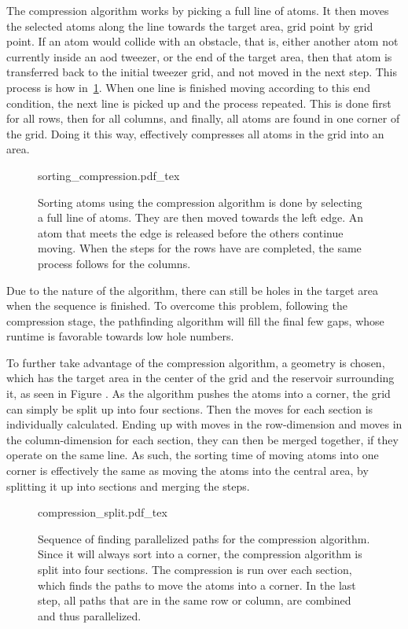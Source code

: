 The compression algorithm works by picking a full line of atoms. It then moves the selected atoms along the line towards the target area, grid point by grid point. If an atom would collide with an obstacle, that is, either another atom not currently inside an \ac{aod} tweezer, or the end of the target area, then that atom is transferred back to the initial tweezer grid, and not moved in the next step. This process is how in~\ref{fig:sorting_compression}. When one line is finished moving according to this end condition, the next line is picked up and the process repeated. This is done first for all rows, then for all columns, and finally, all atoms are found in one corner of the grid. Doing it this way, effectively compresses all atoms in the grid into an area.

\begin{figure}[ht]%
\label{fig:sorting_compression}
\centering
	{sorting_compression.pdf_tex}
	\caption{Sorting atoms using the compression algorithm is done by selecting a full line of atoms. They are then moved towards the left edge. An atom that meets the edge is released before the others continue moving. When the steps for the rows have are completed, the same process follows for the columns.}
\end{figure}

Due to the nature of the algorithm, there can still be holes in the target area when the sequence is finished. To overcome this problem, following the compression stage, the pathfinding algorithm will fill the final few gaps, whose runtime is favorable towards low hole numbers.

To further take advantage of the compression algorithm, a geometry is chosen, which has the target area in the center of the grid and the reservoir surrounding it, as seen in Figure . As the algorithm pushes the atoms into a corner, the grid can simply be split up into four sections. Then the moves for each section is individually calculated. Ending up with moves in the row-dimension and moves in the column-dimension for each section, they can then be merged together, if they operate on the same line. As such, the sorting time of moving atoms into one corner is effectively the same as moving the atoms into the central area, by splitting it up into sections and merging the steps.

\begin{figure}[ht]%
\label{fig:compression_split}
\centering
	{compression_split.pdf_tex}
	\caption{Sequence of finding parallelized paths for the compression algorithm. Since it will always sort into a corner, the compression algorithm is split into four sections. The compression is run over each section, which finds the paths to move the atoms into a corner. In the last step, all paths that are in the same row or column, are combined and thus parallelized.}
\end{figure}

